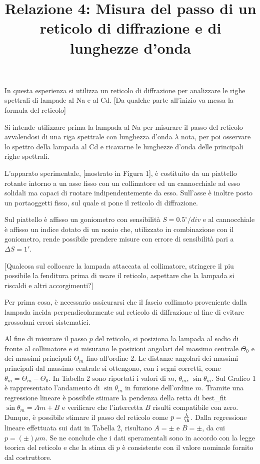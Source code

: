 \documentclass{article}
\title{Relazione 4: Misura del passo di un reticolo di diffrazione
	e di lunghezze d'onda}
\date{}
\begin{document}
	\maketitle
	
	
	In questa esperienza si utilizza un reticolo di diffrazione per analizzare le righe spettrali di lampade al Na e al Cd.  [Da qualche parte all'inizio va messa la formula del reticolo]
	
	Si intende utilizzare prima la lampada al Na per misurare il passo del reticolo avvalendosi di una riga spettrale con lunghezza d'onda $\lambda$ nota, per poi osservare lo spettro della lampada al Cd e ricavarne le lunghezze d'onda delle principali righe spettrali.
	
	L'apparato sperimentale, [mostrato in Figura 1], è costituito da un piattello rotante intorno a un asse fisso con un collimatore ed un cannocchiale ad esso solidali ma capaci di ruotare indipendentemente da esso. Sull'asse è inoltre posto un portaoggetti fisso, sul quale si pone il reticolo di diffrazione.
	
	Sul piattello è affisso un goniometro con sensibilità $S=0.5^{\circ} / div$ e al cannocchiale è affisso un indice dotato di un nonio che, utilizzato in combinazione con il goniometro, rende possibile prendere misure con errore di sensibilità pari a $\Delta S = 1'$.
	
	[Qualcosa sul collocare la lampada attaccata al collimatore, stringere il piu possibile la fenditura prima di usare il reticolo, aspettare che la lampada si riscaldi e altri accorgimenti?]

	Per prima cosa, è necessario assicurarsi che il fascio collimato proveniente dalla lampada incida perpendicolarmente sul reticolo di diffrazione al fine di evitare grossolani errori sistematici. 
	
	Al fine di misurare il passo $p$ del reticolo, si posiziona la lampada al sodio di fronte al collimatore e si misurano le posizioni angolari del massimo centrale $\Theta_0$ e dei massimi principali $\Theta_m$ fino all'ordine 2. Le distanze angolari dei massimi principali dal massimo centrale si ottengono, con i segni corretti, come $\theta_m = \Theta_m - \Theta_0$. In Tabella 2 sono riportati i valori di $m$, $\theta_m$, $\sin \theta_m$. Sul Grafico 1 è rappresentato l'andamento di $\sin \theta_m$ in funzione dell'ordine $m$. Tramite una regressione lineare è possibile stimare la pendenza della retta di best_fit $\sin \theta_m = Am + B$ e verificare che l'intercetta $B$ risulti compatibile con zero. Dunque, è possibile stimare il passo del reticolo come $p=\frac{\lambda}{\A}$. Dalla regressione lineare effettuata sui dati in Tabella 2, risultano $A=\pm$ e $B=\pm$, da cui $p=(\pm)\mu m$. Se ne conclude che i dati speramentali sono in accordo con la legge teorica del reticolo e che la stima di $p$ è consistente con il valore nominale fornito dal costruttore.
\end{document}

